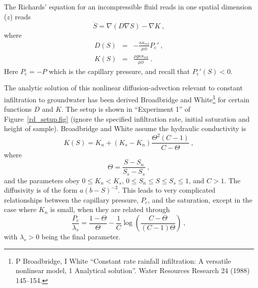 \documentclass[]{scrreprt}
\begin{document}
The Richards' equation for an incompressible fluid reads in one
spatial dimension ($z$) reads 
\begin{equation}
\dot{S} = \nabla \left(D \nabla S\right) - \nabla K \ ,
\end{equation}
where
\begin{eqnarray}
D(S) & = & -\frac{\kappa \kappa_{rel}}{\mu\phi}P_{\mathrm{c}}' \ ,
\\
K(S) & = &\frac{\rho g \kappa\kappa_{\mathrm{rel}}}{\mu\phi} \ .
\end{eqnarray}
Here $P_{\mathrm{c}} = -P$ which is the capillary pressure, and recall
that $P_{\mathrm{c}}'(S)<0$.

The analytic solution of this nonlinear diffusion-advection relevant
to constant infiltration to groundwater has been derived Broadbridge
and White\footnote{P Broadbridge, I White ``Constant rate rainfall
  infiltration: A versatile nonlinear model, 1 Analytical solution''.
  Water Resources Research 24 (1988) 145--154.} for certain functions
$D$ and $K$.  The setup is shown in ``Experiment 1'' of
Figure~\ref{rd_setup.fig} (ignore the specified infiltration rate,
initial saturation and height of sample).  Broadbridge and White
assume the hydraulic conductivity is
\begin{equation}
K(S) = K_{n} + (K_{s}-K_{n})\frac{\Theta^{2}(C-1)}{C-\Theta} \ ,
\end{equation}
where 
\begin{equation}
\Theta = \frac{S - S_{n}}{S_{s} - S_{s}} \ ,
\end{equation}
and the parameters obey $0 \leq K_{n} < K_{s}$, $0 \leq S_{n} \leq S
\leq S_{s}\leq 1$, and $C>1$.  The diffusivity is of the form
$a(b-S)^{-2}$.  This leads to very complicated relationships between
the capillary pressure, $P_{c}$, and the saturation, except in the
case where $K_{n}$ is small, when they are related through
\begin{equation}
\frac{P_{\mathrm{c}}}{\lambda_{s}} = \frac{1-\Theta}{\Theta} - \frac{1}{C}\log
\left( \frac{C-\Theta}{(C-1)\Theta} \right) \ ,
\end{equation}
with $\lambda_{s}>0$ being the final parameter.
\end{document}
